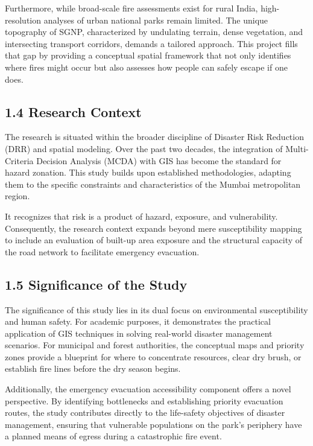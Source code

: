 \documentclass[12pt,a4paper]{article}
\begin{document}
Furthermore, while broad-scale fire assessments exist for rural India, high-resolution analyses of urban national parks remain limited. The unique topography of SGNP, characterized by undulating terrain, dense vegetation, and intersecting transport corridors, demands a tailored approach. This project fills that gap by providing a conceptual spatial framework that not only identifies where fires might occur but also assesses how people can safely escape if one does.



\subsection*{1.4 Research Context}

The research is situated within the broader discipline of Disaster Risk Reduction (DRR) and spatial modeling. Over the past two decades, the integration of Multi-Criteria Decision Analysis (MCDA) with GIS has become the standard for hazard zonation. This study builds upon established methodologies, adapting them to the specific constraints and characteristics of the Mumbai metropolitan region.


It recognizes that risk is a product of hazard, exposure, and vulnerability. Consequently, the research context expands beyond mere susceptibility mapping to include an evaluation of built-up area exposure and the structural capacity of the road network to facilitate emergency evacuation.



\subsection*{1.5 Significance of the Study}

The significance of this study lies in its dual focus on environmental susceptibility and human safety. For academic purposes, it demonstrates the practical application of GIS techniques in solving real-world disaster management scenarios. For municipal and forest authorities, the conceptual maps and priority zones provide a blueprint for where to concentrate resources, clear dry brush, or establish fire lines before the dry season begins.


Additionally, the emergency evacuation accessibility component offers a novel perspective. By identifying bottlenecks and establishing priority evacuation routes, the study contributes directly to the life-safety objectives of disaster management, ensuring that vulnerable populations on the park's periphery have a planned means of egress during a catastrophic fire event.
\end{document}
